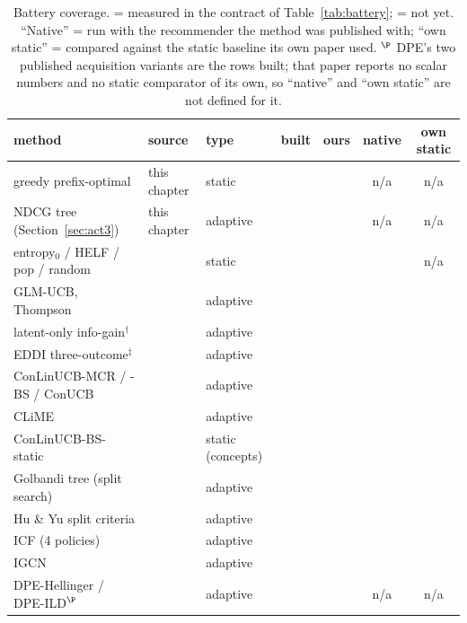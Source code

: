 \documentclass[11pt]{article}
\newcommand{\cmark}{\ding{51}}
\newcommand{\xmark}{\ding{55}}
\begin{document}
\begin{table}[t]
\centering
\caption{Battery coverage. \cmark{} = measured in the contract of Table~\ref{tab:battery};
\xmark{} = not yet. ``Native'' = run with the recommender the method was published with; ``own
static'' = compared against the static baseline its own paper used. $^\P$ DPE's two published
acquisition variants are the rows built; that paper reports no scalar numbers and no static
comparator of its own, so ``native'' and ``own static'' are not defined for it.}
\label{tab:coverage}
\footnotesize
\setlength{\tabcolsep}{4pt}
\begin{tabular}{lllcccc}
\toprule
method & source & type & built & ours & native & own static \\
\midrule
greedy prefix-optimal & this chapter & static & \cmark & \cmark & n/a & n/a \\
NDCG tree (Section~\ref{sec:act3}) & this chapter & adaptive & \cmark & \cmark & n/a & n/a \\
entropy$_0$ / HELF / pop / random & \cite{rashid2002getting,rashid2008learning} & static & \cmark & \cmark & \xmark & n/a \\
GLM-UCB, Thompson & \cite{zhao2013interactive} & adaptive & \cmark & \cmark & \xmark & \xmark \\
latent-only info-gain$^\dagger$ & \cite{ma2019eddi} & adaptive & \cmark & \cmark & \cmark & \xmark \\
EDDI three-outcome$^\ddagger$ & \cite{ma2019eddi} & adaptive & \cmark & \cmark & \xmark & \xmark \\
\midrule
ConLinUCB-MCR / -BS / ConUCB & \cite{wang2023conlinucb,zhang2020conucb} & adaptive & \cmark & \cmark & \xmark & \xmark \\
CLiME & \cite{liu2025clisk} & adaptive & \cmark & \cmark & \xmark & \xmark \\
ConLinUCB-BS-static & \cite{wang2023conlinucb} & static (concepts) & \cmark & \cmark & \xmark & \xmark \\
Golbandi tree (split search) & \cite{golbandi2011adaptive} & adaptive & \cmark & \cmark & \cmark & \cmark \\
Hu \& Yu split criteria & \cite{hu2013interview} & adaptive & \cmark & \cmark & \cmark & \xmark \\
ICF (4 policies) & \cite{zhao2013interactive} & adaptive & \xmark & \xmark & \xmark & \xmark \\
IGCN & \cite{rashid2008learning} & adaptive & \cmark & \cmark & \cmark & \xmark \\
DPE-Hellinger / DPE-ILD$^\P$ & \cite{parapar2021dpe} & adaptive & \cmark & \cmark & n/a & n/a \\

\end{tabular}
\end{table}
\end{document}
